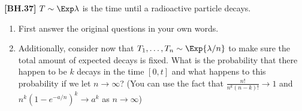 \begin{exercise}
	\textbf{[BH.37]}  $T\sim \Exp\lambda$ is the time until a radioactive particle decays.
	\begin{enumerate}
		\item First answer the original questions in your own words.		
		\item Additionally, consider now that $T_1, \ldots, T_n \sim \Exp{\lambda/n}$ to make sure the total amount of expected decays is fixed. What is the probability that there happen to be $k$ decays in the time $[0,t]$ and what happens to this probability if we let $n\rightarrow\infty$? (You can use the fact that $\frac{n!}{n^k (n-k)!} \rightarrow 1$ and $n^k (1-e^{-a/n})^k \rightarrow a^k$ as $n \rightarrow \infty$)
	\end{enumerate} 

\end{exercise}